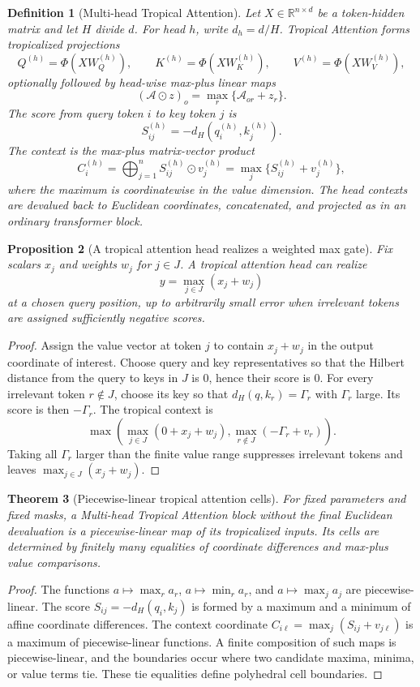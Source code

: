 \documentclass[11pt]{article}
\newtheorem{definition}{Definition}[section]
\newtheorem{theorem}[definition]{Theorem}
\newtheorem{proposition}[definition]{Proposition}
\newcommand{\R}{\mathbb{R}}
\newcommand{\1}{\mathbf{1}}
\begin{document}
\begin{definition}[Multi-head Tropical Attention]
Let \(X\in\R^{n\times d}\) be a token-hidden matrix and let \(H\) divide \(d\). For head \(h\), write \(d_h=d/H\). Tropical Attention forms tropicalized projections
\[
  Q^{(h)}= \Phi(XW_Q^{(h)}),\qquad
  K^{(h)}= \Phi(XW_K^{(h)}),\qquad
  V^{(h)}= \Phi(XW_V^{(h)}),
\]
optionally followed by head-wise max-plus linear maps
\[
  (\mathcal A\odot z)_o=\max_r\{\mathcal A_{or}+z_r\}.
\]
The score from query token \(i\) to key token \(j\) is
\[
  S_{ij}^{(h)}=-d_H(q_i^{(h)},k_j^{(h)}).
\]
The context is the max-plus matrix-vector product
\[
  C_i^{(h)}
  =
  \bigoplus_{j=1}^n S_{ij}^{(h)}\odot v_j^{(h)}
  =
  \max_j\{S_{ij}^{(h)}+v_j^{(h)}\},
\]
where the maximum is coordinatewise in the value dimension. The head contexts are devalued back to Euclidean coordinates, concatenated, and projected as in an ordinary transformer block.
\end{definition}

\begin{proposition}[A tropical attention head realizes a weighted max gate]
Fix scalars \(x_j\) and weights \(w_j\) for \(j\in J\). A tropical attention head can realize
\[
  y=\max_{j\in J}(x_j+w_j)
\]
at a chosen query position, up to arbitrarily small error when irrelevant tokens are assigned sufficiently negative scores.
\end{proposition}
\begin{proof}
Assign the value vector at token \(j\) to contain \(x_j+w_j\) in the output coordinate of interest. Choose query and key representatives so that the Hilbert distance from the query to keys in \(J\) is \(0\), hence their score is \(0\). For every irrelevant token \(r\notin J\), choose its key so that \(d_H(q,k_r)=\Gamma_r\) with \(\Gamma_r\) large. Its score is then \(-\Gamma_r\). The tropical context is
\[
\max\left(\max_{j\in J}(0+x_j+w_j),\max_{r\notin J}(-\Gamma_r+v_r)\right).
\]
Taking all \(\Gamma_r\) larger than the finite value range suppresses irrelevant tokens and leaves \(\max_{j\in J}(x_j+w_j)\).
\end{proof}

\begin{theorem}[Piecewise-linear tropical attention cells]
For fixed parameters and fixed masks, a Multi-head Tropical Attention block without the final Euclidean devaluation is a piecewise-linear map of its tropicalized inputs. Its cells are determined by finitely many equalities of coordinate differences and max-plus value comparisons.
\end{theorem}
\begin{proof}
The functions \(a\mapsto\max_r a_r\), \(a\mapsto\min_r a_r\), and \(a\mapsto\max_j a_j\) are piecewise-linear. The score \(S_{ij}=-d_H(q_i,k_j)\) is formed by a maximum and a minimum of affine coordinate differences. The context coordinate \(C_{i\ell}=\max_j(S_{ij}+v_{j\ell})\) is a maximum of piecewise-linear functions. A finite composition of such maps is piecewise-linear, and the boundaries occur where two candidate maxima, minima, or value terms tie. These tie equalities define polyhedral cell boundaries.
\end{proof}
\end{document}
